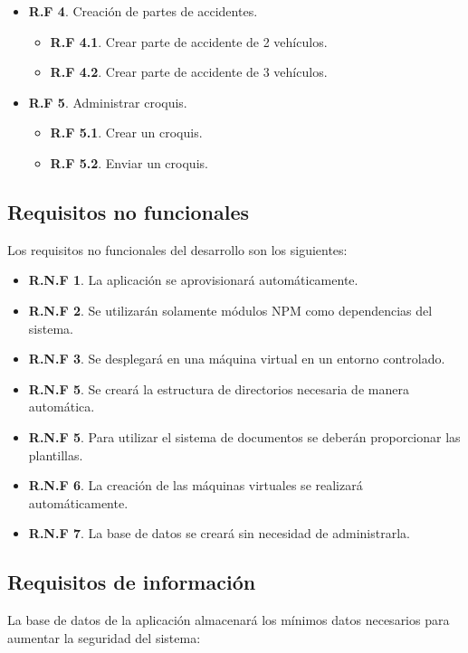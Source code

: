 \begin{itemize}
	\item \textbf{R.F 4}. Creación de partes de accidentes.
	\begin{itemize}
		\item \textbf{R.F 4.1}. Crear parte de accidente de 2 vehículos.
		\item \textbf{R.F 4.2}. Crear parte de accidente de 3 vehículos.
	\end{itemize}

	\item \textbf{R.F 5}. Administrar croquis.
	\begin{itemize}
		\item \textbf{R.F 5.1}. Crear un croquis.
		\item \textbf{R.F 5.2}. Enviar un croquis.
	\end{itemize}


\end{itemize}

\subsection{Requisitos no funcionales}
Los requisitos no funcionales del desarrollo son los siguientes: 

\begin{itemize}
	\item \textbf{R.N.F 1}. La aplicación se aprovisionará automáticamente.
	\item \textbf{R.N.F 2}. Se utilizarán solamente módulos NPM como dependencias del sistema. 
	\item \textbf{R.N.F 3}. Se desplegará en una máquina virtual en un entorno controlado.
	\item \textbf{R.N.F 5}. Se creará la estructura de directorios necesaria de manera automática. 
	\item \textbf{R.N.F 5}. Para utilizar el sistema de documentos se deberán proporcionar las plantillas.
	\item \textbf{R.N.F 6}. La creación de las máquinas virtuales se realizará automáticamente.
	\item \textbf{R.N.F 7}. La base de datos se creará sin necesidad de administrarla.
\end{itemize}

\subsection{Requisitos de información}
La base de datos de la aplicación almacenará los mínimos datos necesarios para aumentar la seguridad del 
sistema:

